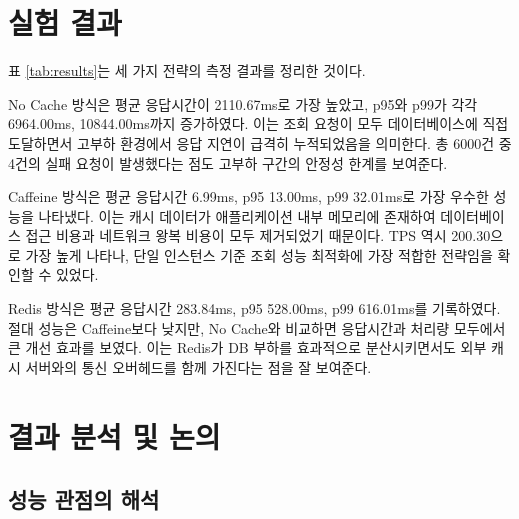 \documentclass[10pt,a4paper,twocolumn]{article}
\begin{document}
\section{실험 결과}

표 \ref{tab:results}는 세 가지 전략의 측정 결과를 정리한 것이다.

\begin{table}[H]
    \centering
    \caption{캐시 전략별 성능 비교 결과}
    \label{tab:results}
    \scriptsize
    \setlength{\tabcolsep}{3pt}
    \renewcommand{\arraystretch}{1.12}
\end{table}

No Cache 방식은 평균 응답시간이 2110.67ms로 가장 높았고, p95와 p99가 각각 6964.00ms, 10844.00ms까지 증가하였다. 이는 조회 요청이 모두 데이터베이스에 직접 도달하면서 고부하 환경에서 응답 지연이 급격히 누적되었음을 의미한다. 총 6000건 중 4건의 실패 요청이 발생했다는 점도 고부하 구간의 안정성 한계를 보여준다.

Caffeine 방식은 평균 응답시간 6.99ms, p95 13.00ms, p99 32.01ms로 가장 우수한 성능을 나타냈다. 이는 캐시 데이터가 애플리케이션 내부 메모리에 존재하여 데이터베이스 접근 비용과 네트워크 왕복 비용이 모두 제거되었기 때문이다. TPS 역시 200.30으로 가장 높게 나타나, 단일 인스턴스 기준 조회 성능 최적화에 가장 적합한 전략임을 확인할 수 있었다.

Redis 방식은 평균 응답시간 283.84ms, p95 528.00ms, p99 616.01ms를 기록하였다. 절대 성능은 Caffeine보다 낮지만, No Cache와 비교하면 응답시간과 처리량 모두에서 큰 개선 효과를 보였다. 이는 Redis가 DB 부하를 효과적으로 분산시키면서도 외부 캐시 서버와의 통신 오버헤드를 함께 가진다는 점을 잘 보여준다.

\section{결과 분석 및 논의}

\subsection{성능 관점의 해석}
\end{document}
